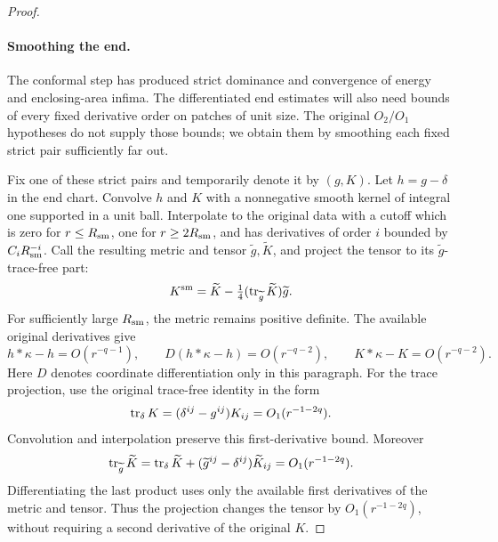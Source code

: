\begin{proof}
\paragraph{Smoothing the end.}
The conformal step has produced strict dominance and convergence of energy
and enclosing-area infima.  The differentiated end estimates will also
need bounds of every fixed derivative order on patches of unit size.
The original \(O_2/O_1\) hypotheses do not supply those bounds; we obtain
them by smoothing each fixed strict pair sufficiently far out.

Fix one of these strict pairs and temporarily denote it by \((g,K)\).
Let \(h=g-\delta\) in the end chart.  Convolve \(h\) and \(K\)
with a nonnegative smooth kernel of integral one supported in a unit
ball.  Interpolate to the original data with a cutoff which is zero
for \(r\le R_{\rm sm}\), one for \(r\ge2R_{\rm sm}\), and has
derivatives of order \(i\) bounded by \(C_iR_{\rm sm}^{-i}\).
Call the resulting metric and tensor \(\widetilde g,\widetilde K\),
and project the tensor to its \(\widetilde g\)-trace-free part:
\[
 K^{\rm sm}=\widetilde K-\tfrac14
                (\operatorname{tr}_{\widetilde g}\widetilde K)\widetilde g.
\]
For sufficiently large \(R_{\rm sm}\), the metric remains positive
definite.  The available original derivatives give
\[
 h*\kappa-h=O(r^{-q-1}),\qquad
 D(h*\kappa-h)=O(r^{-q-2}),\qquad
 K*\kappa-K=O(r^{-q-2}).
\]
Here \(D\) denotes coordinate differentiation only in this paragraph.
For the trace projection, use the original trace-free identity in the
form
\[
 \operatorname{tr}_\delta K=(\delta^{ij}-g^{ij})K_{ij}
                       =O_1(r^{-1-2q}).
\]
Convolution and interpolation preserve this first-derivative bound.
Moreover
\[
 \operatorname{tr}_{\widetilde g}\widetilde K
 =\operatorname{tr}_\delta\widetilde K
      +(\widetilde g^{ij}-\delta^{ij})\widetilde K_{ij}
 =O_1(r^{-1-2q}).
\]
Differentiating the last product uses only the available first derivatives
of the metric and tensor.  Thus the projection changes the tensor by
\(O_1(r^{-1-2q})\), without requiring a second derivative of the original
\(K\).


\end{proof}
